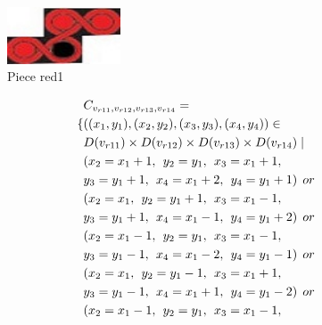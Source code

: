 \begin{appendices}
\begin{itemize}
\begin{figure}[H]
    \centering
    \includegraphics[width=0.3\textwidth]{figs/red1.jpg}
    \caption{Piece red1}
\end{figure}
\begin{align*}
&\Const{r11}{r12}{r13}{r14}=\\
\{&((x_{1},y_{1}),(x_{2},y_{2}),(x_{3},y_{3}),(x_{4},y_{4}))\in 
\\&\Domain{r11}\times \Domain{r12}\times\Domain{r13}\times\Domain{r14}\mid\\
&(x_{2} = x_{1} + 1,\hspace{1ex}y_{2} = y_{1},\hspace{1ex}x_{3} = x_{1} + 1, 
\\&y_{3} = y_{1}+1,\hspace{1ex}x_{4} = x_{1}+2,\hspace{1ex}y_{4} = y_{1}+1)\hspace{1ex} or\\
&(x_{2} = x_{1},\hspace{1ex}y_{2} = y_{1}+1,\hspace{1ex}x_{3} = x_{1}-1, 
\\&y_{3} = y_{1}+1,\hspace{1ex}x_{4} = x_{1}-1,\hspace{1ex}y_{4} = y_{1}+2)\hspace{1ex} or\\
&(x_{2} = x_{1}-1,\hspace{1ex}y_{2} = y_{1},\hspace{1ex}x_{3} = x_{1}-1,
\\&y_{3} = y_{1}-1,\hspace{1ex}x_{4} = x_{1}-2,\hspace{1ex}y_{4} = y_{1}-1)\hspace{1ex} or\\
&(x_{2} = x_{1},\hspace{1ex}y_{2} = y_{1}-1,\hspace{1ex}x_{3} = x_{1}+1, 
\\&y_{3} = y_{1}-1,\hspace{1ex}x_{4} = x_{1}+1,\hspace{1ex}y_{4} = y_{1}-2)\hspace{1ex} or\\
&(x_{2} = x_{1}-1,\hspace{1ex}y_{2} = y_{1},\hspace{1ex}x_{3} = x_{1}-1, 

\end{align*}
\end{itemize}
\end{appendices}
